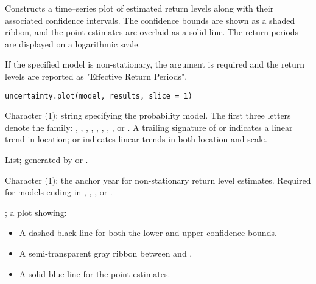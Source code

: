 \documentclass[a4paper]{book}
\begin{document}
%
\begin{Description}
Constructs a time–series plot of estimated return levels along with their
associated confidence intervals. The confidence bounds are shown as a shaded ribbon,
and the point estimates are overlaid as a solid line. The return periods are
displayed on a logarithmic scale.

If the specified model is non-stationary, the  argument is required
and the return levels are reported as "Effective Return Periods".
\end{Description}
%
\begin{Usage}
\begin{verbatim}
uncertainty.plot(model, results, slice = 1)
\end{verbatim}
\end{Usage}
%
\begin{Arguments}
\begin{ldescription}
\item[\code{model}] Character (1); string specifying the probability model. The first three
letters denote the family: , , , , , , ,
, or . A trailing signature of  or  indicates a linear trend
in location;  or  indicates linear trends in both location and scale.

\item[\code{results}] List; generated by  or .

\item[\code{slice}] Character (1); the anchor year for non-stationary return level estimates.
Required for models ending in , , , or .
\end{ldescription}
\end{Arguments}
%
\begin{Value}
; a plot showing:
\begin{itemize}

\item{} A dashed black line for both the lower and upper confidence bounds.
\item{} A semi-transparent gray ribbon between  and .
\item{} A solid blue line for the point estimates.

\end{itemize}

\end{Value}
\end{document}
